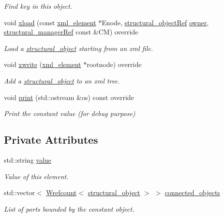 \begin{DoxyCompactItemize}
\begin{DoxyCompactList}\small\item\em Find key in this object. \end{DoxyCompactList}\item 
void \hyperlink{classconstant__o_ad2453aac32e841ff75d32fb50249ebdc}{xload} (const \hyperlink{classxml__element}{xml\+\_\+element} $\ast$Enode, \hyperlink{structural__objects_8hpp_a8ea5f8cc50ab8f4c31e2751074ff60b2}{structural\+\_\+object\+Ref} \hyperlink{classstructural__object_a3e96b3e00b8a78adfc44872d82e186ea}{owner}, \hyperlink{structural__manager_8hpp_ab3136f0e785d8535f8d252a7b53db5b5}{structural\+\_\+manager\+Ref} const \&CM) override
\begin{DoxyCompactList}\small\item\em Load a \hyperlink{classstructural__object}{structural\+\_\+object} starting from an xml file. \end{DoxyCompactList}\item 
void \hyperlink{classconstant__o_a6d7224d9422459b095468da97fb8a4f0}{xwrite} (\hyperlink{classxml__element}{xml\+\_\+element} $\ast$rootnode) override
\begin{DoxyCompactList}\small\item\em Add a \hyperlink{classstructural__object}{structural\+\_\+object} to an xml tree. \end{DoxyCompactList}\item 
void \hyperlink{classconstant__o_a9f4a121a1fcf146a4646f383fceb5d0a}{print} (std\+::ostream \&os) const override
\begin{DoxyCompactList}\small\item\em Print the constant value (for debug purpose) \end{DoxyCompactList}\end{DoxyCompactItemize}
\subsection*{Private Attributes}
\begin{DoxyCompactItemize}
\item 
std\+::string \hyperlink{classconstant__o_ab9224c81e6c5783b8db8d68877dc1abe}{value}
\begin{DoxyCompactList}\small\item\em Value of this element. \end{DoxyCompactList}\item 
std\+::vector$<$ \hyperlink{classWrefcount}{Wrefcount}$<$ \hyperlink{classstructural__object}{structural\+\_\+object} $>$ $>$ \hyperlink{classconstant__o_a668eff51885a21a85d29e12e470f551c}{connected\+\_\+objects}
\begin{DoxyCompactList}\small\item\em List of ports bounded by the constant object. \end{DoxyCompactList}\end{DoxyCompactItemize}
